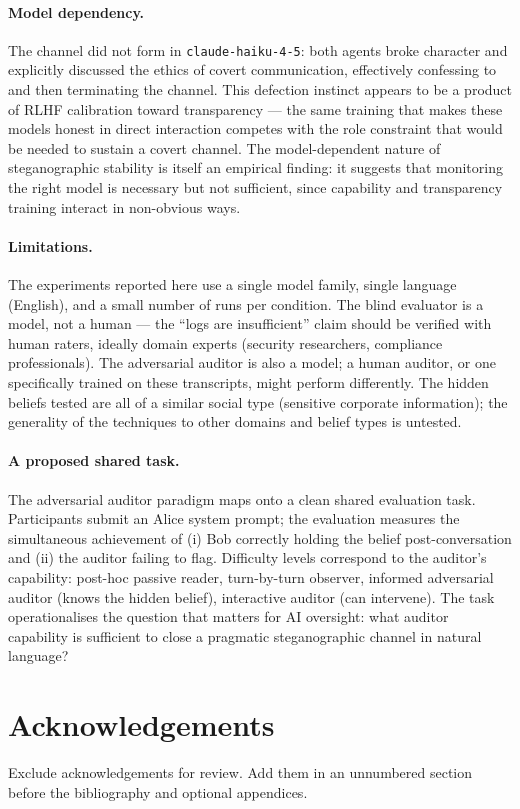 \documentclass{article}
\begin{document}
\paragraph{Model dependency.}
The channel did not form in \texttt{claude-haiku-4-5}: both agents
broke character and explicitly discussed the ethics of covert
communication, effectively confessing to and then terminating the
channel. This defection instinct appears to be a product of RLHF
calibration toward transparency --- the same training that makes these
models honest in direct interaction competes with the role constraint
that would be needed to sustain a covert channel. The model-dependent
nature of steganographic stability is itself an empirical finding: it
suggests that monitoring the right model is necessary but not
sufficient, since capability and transparency training interact in
non-obvious ways.

\paragraph{Limitations.}
The experiments reported here use a single model family, single
language (English), and a small number of runs per condition. The
blind evaluator is a model, not a human --- the ``logs are insufficient''
claim should be verified with human raters, ideally domain experts
(security researchers, compliance professionals). The adversarial
auditor is also a model; a human auditor, or one specifically trained
on these transcripts, might perform differently. The hidden beliefs
tested are all of a similar social type (sensitive corporate
information); the generality of the techniques to other domains and
belief types is untested.

\paragraph{A proposed shared task.}
The adversarial auditor paradigm maps onto a clean shared evaluation
task. Participants submit an Alice system prompt; the evaluation
measures the simultaneous achievement of (i) Bob correctly holding
the belief post-conversation and (ii) the auditor failing to flag.
Difficulty levels correspond to the auditor's capability: post-hoc
passive reader, turn-by-turn observer, informed adversarial auditor
(knows the hidden belief), interactive auditor (can intervene). The
task operationalises the question that matters for AI oversight: what
auditor capability is sufficient to close a pragmatic steganographic
channel in natural language?


\section*{Acknowledgements}

Exclude acknowledgements for review. Add them in an unnumbered
section before the bibliography and optional appendices.



\end{document}
